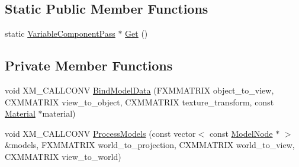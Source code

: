 \subsection*{Static Public Member Functions}
\begin{DoxyCompactItemize}
\item 
static \hyperlink{classmage_1_1_variable_component_pass}{Variable\+Component\+Pass} $\ast$ \hyperlink{classmage_1_1_variable_component_pass_a564365cd8383c82fe94ae017b29dcdd2}{Get} ()
\end{DoxyCompactItemize}
\subsection*{Private Member Functions}
\begin{DoxyCompactItemize}
\item 
void X\+M\+\_\+\+C\+A\+L\+L\+C\+O\+NV \hyperlink{classmage_1_1_variable_component_pass_a5aa48514a6f7dc412c4eadb082687d65}{Bind\+Model\+Data} (F\+X\+M\+M\+A\+T\+R\+IX object\+\_\+to\+\_\+view, C\+X\+M\+M\+A\+T\+R\+IX view\+\_\+to\+\_\+object, C\+X\+M\+M\+A\+T\+R\+IX texture\+\_\+transform, const \hyperlink{classmage_1_1_material}{Material} $\ast$material)
\item 
void X\+M\+\_\+\+C\+A\+L\+L\+C\+O\+NV \hyperlink{classmage_1_1_variable_component_pass_a98cbe2d4dbdcf376a36c6306f54afd24}{Process\+Models} (const vector$<$ const \hyperlink{classmage_1_1_model_node}{Model\+Node} $\ast$ $>$ \&models, F\+X\+M\+M\+A\+T\+R\+IX world\+\_\+to\+\_\+projection, C\+X\+M\+M\+A\+T\+R\+IX world\+\_\+to\+\_\+view, C\+X\+M\+M\+A\+T\+R\+IX view\+\_\+to\+\_\+world)
\end{DoxyCompactItemize}
